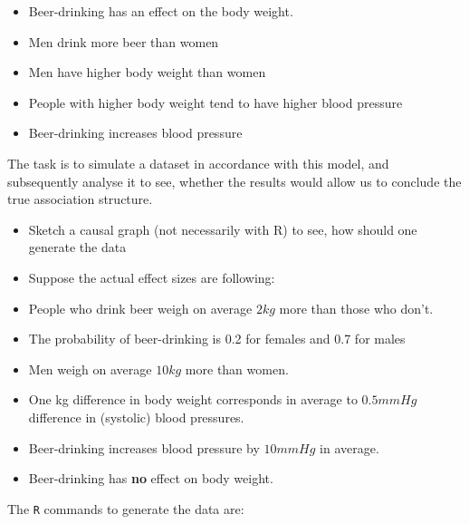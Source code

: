 \documentclass[
]{book}
\providecommand{\tightlist}{%
  \setlength{\itemsep}{0pt}\setlength{\parskip}{0pt}}
\begin{document}
\begin{itemize}
\tightlist
\item
  Beer-drinking has an effect on the body weight.
\item
  Men drink more beer than women
\item
  Men have higher body weight than women
\item
  People with higher body weight tend to have higher blood pressure
\item
  Beer-drinking increases blood pressure
\end{itemize}

The task is to simulate a dataset in accordance with this model, and
subsequently analyse it to see, whether the results would allow us to
conclude the true association structure.

\begin{itemize}
\item
  Sketch a causal graph (not necessarily with R) to see, how should one generate the data
\item
  Suppose the actual effect sizes are following:
\item
  People who drink beer weigh on average \(2kg\) more than those who don't.
\item
  The probability of beer-drinking is 0.2 for females and 0.7 for males
\item
  Men weigh on average \(10kg\) more than women.
\item
  One kg difference in body weight corresponds in
  average to \(0.5mmHg\) difference in (systolic) blood pressures.
\item
  Beer-drinking increases blood pressure by \(10mmHg\) in average.
\item
  Beer-drinking has \textbf{no} effect on body weight.
\end{itemize}

The \texttt{R} commands to generate the data are:
\end{document}
